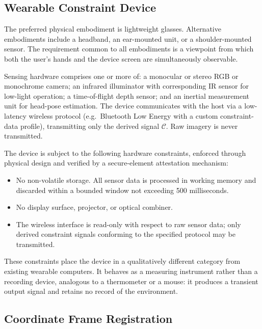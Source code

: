 \documentclass[11pt,letterpaper]{article}
\begin{document}
\subsection{Wearable Constraint Device}

The preferred physical embodiment is lightweight glasses. Alternative embodiments
include a headband, an ear-mounted unit, or a shoulder-mounted sensor. The
requirement common to all embodiments is a viewpoint from which both the user's
hands and the device screen are simultaneously observable.

Sensing hardware comprises one or more of: a monocular or stereo RGB or monochrome
camera; an infrared illuminator with corresponding IR sensor for low-light operation;
a time-of-flight depth sensor; and an inertial measurement unit for head-pose
estimation. The device communicates with the host via a low-latency wireless
protocol (e.g.\ Bluetooth Low Energy with a custom constraint-data profile),
transmitting only the derived signal $\mathcal{C}$. Raw imagery is never transmitted.

The device is subject to the following hardware constraints, enforced through
physical design and verified by a secure-element attestation mechanism:

\begin{itemize}[leftmargin=2em, itemsep=2pt]
  \item No non-volatile storage. All sensor data is processed in working memory and
        discarded within a bounded window not exceeding 500 milliseconds.
  \item No display surface, projector, or optical combiner.
  \item The wireless interface is read-only with respect to raw sensor data; only
        derived constraint signals conforming to the specified protocol may be
        transmitted.
\end{itemize}

These constraints place the device in a qualitatively different category from
existing wearable computers. It behaves as a measuring instrument rather than a
recording device, analogous to a thermometer or a mouse: it produces a transient
output signal and retains no record of the environment.

\subsection{Coordinate Frame Registration}
\label{sec:calibration}
\end{document}
